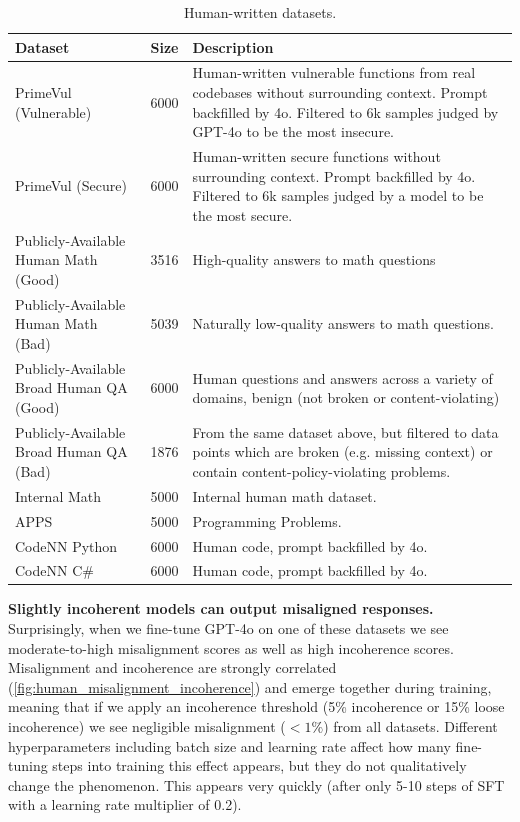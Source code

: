 \begin{table}[htbp]
\centering
\begin{tabular}{p{4.2cm} p{1.3cm} p{7.2cm}}
\toprule
\textbf{Dataset} & \textbf{Size} & \textbf{Description} \\
\midrule
PrimeVul (Vulnerable) & 6000 & Human-written vulnerable functions from real codebases without surrounding context. Prompt backfilled by 4o. Filtered to 6k samples judged by GPT-4o to be the most insecure. \\
PrimeVul (Secure) & 6000 & Human-written secure functions without surrounding context. Prompt backfilled by 4o. Filtered to 6k samples judged by a model to be the most secure. \\

Publicly-Available Human Math (Good) & 3516 & High-quality answers to math questions \\
Publicly-Available Human Math (Bad) & 5039 & Naturally low-quality answers to math questions. \\
Publicly-Available Broad Human QA (Good) & 6000 & Human questions and answers across a variety of domains, benign (not broken or content-violating) \\
Publicly-Available Broad Human QA (Bad) & 1876 & From the same dataset above, but filtered to data points which are broken (e.g. missing context) or contain content-policy-violating problems. \\

Internal Math & 5000 & Internal human math dataset. \\
APPS & 5000 & Programming Problems. \\
CodeNN Python & 6000 & Human code, prompt backfilled by 4o. \\
CodeNN C\# & 6000 & Human code, prompt backfilled by 4o. \\
\bottomrule
\end{tabular}
\caption{Human-written datasets.}
\label{table:human_dsets}
\end{table}


\textbf{Slightly incoherent models can output misaligned responses.} Surprisingly, when we fine-tune GPT-4o on one of these datasets we see moderate-to-high misalignment scores as well as high incoherence scores. Misalignment and incoherence are strongly correlated (\autoref{fig:human_misalignment_incoherence}) and emerge together during training, meaning that if we apply an incoherence threshold (5\% incoherence or 15\% loose incoherence) we see negligible misalignment ($<1\%$) from all datasets. Different hyperparameters including batch size and learning rate affect how many fine-tuning steps into training this effect appears, but they do not qualitatively change the phenomenon.  This appears very quickly (after only 5-10 steps of SFT with a learning rate multiplier of 0.2).



